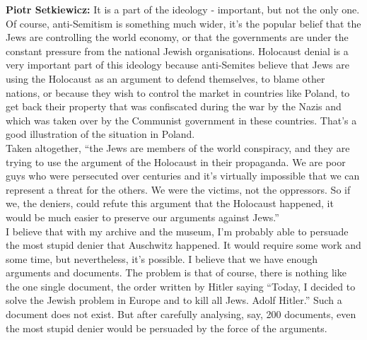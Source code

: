 \textbf{Piotr Setkiewicz:} It is a part of the ideology - important, but not the only one. Of course, anti-Semitism is something much wider, it’s the popular belief that the Jews are controlling the world economy, or that the governments are under the constant pressure from the national Jewish organisations. Holocaust denial is a very important part of this ideology because anti-Semites believe that Jews are using the Holocaust as an argument to defend themselves, to blame other nations, or because they wish to control the market in countries like Poland, to get back their property that was confiscated during the war by the Nazis and which was taken over by the Communist government in these countries. That’s a good illustration of the situation in Poland.\\ 
Taken altogether, ``the Jews are members of the world conspiracy, and they are trying to use the argument of the Holocaust in their propaganda. We are poor guys who were persecuted over centuries and it’s virtually impossible that we can represent a threat for the others. We were the victims, not the oppressors. So if we, the deniers, could refute this argument that the Holocaust happened, it would be much easier to preserve our arguments against Jews.'' \\
I believe that with my archive and the museum, I’m probably able to persuade the most stupid denier that Auschwitz happened. It would require some work and some time, but nevertheless, it’s possible. I believe that we have enough arguments and documents. The problem is that of course, there is nothing like the one single document, the order written by Hitler saying ``Today, I decided to solve the Jewish problem in Europe and to kill all Jews. Adolf Hitler.'' Such a document does not exist. But after carefully analysing, say, 200 documents, even the most stupid denier would be persuaded by the force of the arguments.